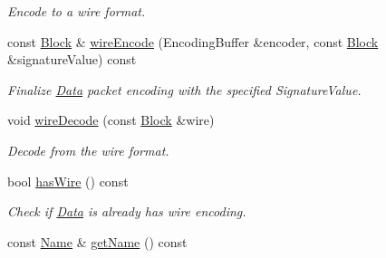 \begin{DoxyCompactItemize}
\begin{DoxyCompactList}\small\item\em Encode to a wire format. \end{DoxyCompactList}\item 
const \hyperlink{classndn_1_1Block}{Block} \& \hyperlink{classndn_1_1Data_ab75caf00f7b730631e72312dfeb42f5d}{wire\+Encode} (Encoding\+Buffer \&encoder, const \hyperlink{classndn_1_1Block}{Block} \&signature\+Value) const
\begin{DoxyCompactList}\small\item\em Finalize \hyperlink{classndn_1_1Data}{Data} packet encoding with the specified Signature\+Value. \end{DoxyCompactList}\item 
void \hyperlink{classndn_1_1Data_a0ebfd65a6323221b44a995f15efbfef2}{wire\+Decode} (const \hyperlink{classndn_1_1Block}{Block} \&wire)\hypertarget{classndn_1_1Data_a0ebfd65a6323221b44a995f15efbfef2}{}\label{classndn_1_1Data_a0ebfd65a6323221b44a995f15efbfef2}

\begin{DoxyCompactList}\small\item\em Decode from the wire format. \end{DoxyCompactList}\item 
bool \hyperlink{classndn_1_1Data_ad2e480ccab6e2024ccb53a23bf88bdbd}{has\+Wire} () const\hypertarget{classndn_1_1Data_ad2e480ccab6e2024ccb53a23bf88bdbd}{}\label{classndn_1_1Data_ad2e480ccab6e2024ccb53a23bf88bdbd}

\begin{DoxyCompactList}\small\item\em Check if \hyperlink{classndn_1_1Data}{Data} is already has wire encoding. \end{DoxyCompactList}\item 
const \hyperlink{classndn_1_1Name}{Name} \& \hyperlink{classndn_1_1Data_a14ed396d06bf43b86e4b0a67a4866303}{get\+Name} () const\hypertarget{classndn_1_1Data_a14ed396d06bf43b86e4b0a67a4866303}{}\label{classndn_1_1Data_a14ed396d06bf43b86e4b0a67a4866303}


\end{DoxyCompactItemize}

